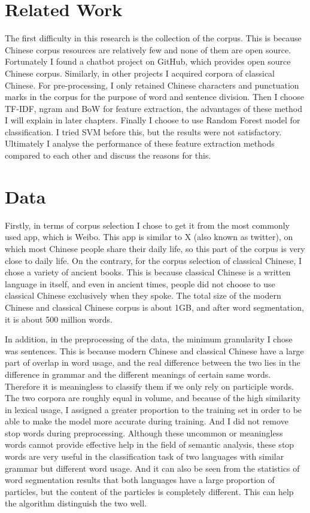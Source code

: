 \documentclass[11pt]{article}
\begin{document}
\section{Related Work}

The first difficulty in this research is the collection of the corpus. This is because Chinese corpus resources are relatively few and none of them are open source. Fortunately I found a chatbot project on GitHub, which provides open source Chinese corpus. Similarly, in other projects I acquired corpora of classical Chinese. For pre-processing, I only retained Chinese characters and punctuation marks in the corpus for the purpose of word and sentence division. Then I choose TF-IDF, ngram and BoW for feature extraction, the advantages of these method I will explain in later chapters. Finally I choose to use Random Forest model for classification. I tried SVM before this, but the results were not satisfactory. Ultimately I analyse the performance of these feature extraction methods compared to each other and discuss the reasons for this.

\section{Data}

Firstly, in terms of corpus selection I chose to get it from the most commonly used app, which is Weibo. This app is similar to X (also known as twitter), on which most Chinese people share their daily life, so this part of the corpus is very close to daily life. On the contrary, for the corpus selection of classical Chinese, I chose a variety of ancient books. This is because classical Chinese is a written language in itself, and even in ancient times, people did not choose to use classical Chinese exclusively when they spoke. The total size of the modern Chinese and classical Chinese corpus is about 1GB, and after word segmentation, it is about 500 million words.

In addition, in the preprocessing of the data, the minimum granularity I chose was sentences. This is because modern Chinese and classical Chinese have a large part of overlap in word usage, and the real difference between the two lies in the difference in grammar and the different meanings of certain same words. Therefore it is meaningless to classify them if we only rely on participle words. The two corpora are roughly equal in volume, and because of the high similarity in lexical usage, I assigned a greater proportion to the training set in order to be able to make the model more accurate during training. And I did not remove stop words during preprocessing. Although these uncommon or meaningless words cannot provide effective help in the field of semantic analysis, these stop words are very useful in the classification task of two languages with similar grammar but different word usage. And it can also be seen from the statistics of word segmentation results that both languages have a large proportion of particles, but the content of the particles is completely different. This can help the algorithm distinguish the two well.
\end{document}
